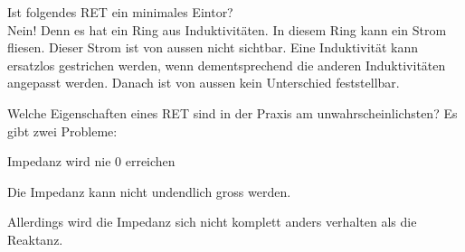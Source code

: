 \begin{karte}{Ist folgendes RET ein minimales Eintor?\\[5pt]
		}
	Nein! Denn es hat ein Ring aus Induktivitäten. In diesem Ring kann ein Strom fliesen. Dieser Strom ist von aussen nicht sichtbar. Eine Induktivität kann ersatzlos gestrichen werden, wenn dementsprechend die anderen Induktivitäten angepasst werden. Danach ist von aussen kein Unterschied feststellbar.\\
	\begin{center}
		
	\end{center}
\end{karte}

\begin{karte}{Welche Eigenschaften eines RET sind in der Praxis am unwahrscheinlichsten?}
	Es gibt zwei Probleme:
	\begin{compactitem}
		\item Impedanz wird nie 0 erreichen
		\item Die Impedanz kann nicht undendlich gross werden.
	\end{compactitem}
	Allerdings wird die Impedanz sich nicht komplett anders verhalten als die Reaktanz.
	
\end{karte}


